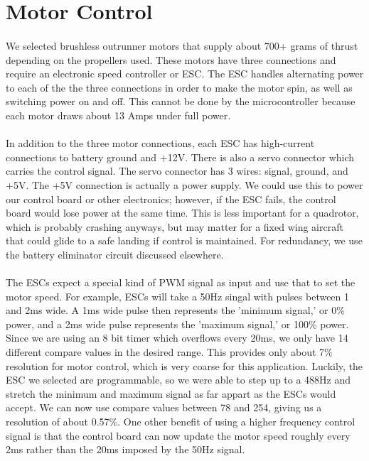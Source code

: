 \section{Motor Control}
\paragraph{}
We selected brushless outrunner motors that supply about 700+ grams of thrust depending on the propellers used.  These motors have three connections and require an electronic speed controller or ESC.  The ESC handles alternating power to each of the the three connections in order to make the motor spin, as well as switching power on and off.  This cannot be done by the microcontroller because each motor draws about 13 Amps under full power.
\paragraph{}
In addition to the three motor connections, each ESC has high-current connections to battery ground and +12V.  There is also a servo connector which carries the control signal.  The servo connector has 3 wires: signal, ground, and +5V.  The +5V connection is actually a power supply.  We could use this to power our control board or other electronics; however, if the ESC fails, the control board would lose power at the same time.  This is less important for a quadrotor, which is probably crashing anyways, but may matter for a fixed wing aircraft that could glide to a safe landing if control is maintained.  For redundancy, we use the battery eliminator circuit discussed elsewhere.
\paragraph{}
The ESCs expect a special kind of PWM signal as input and use that to set the motor speed.  For example, ESCs will take a 50Hz singal with pulses between 1 and 2ms wide.  A 1ms wide pulse then represents the 'minimum signal,' or 0\% power, and a 2ms wide pulse represents the 'maximum signal,' or 100\% power.  Since we are using an 8 bit timer which overflows every 20ms, we only have 14 different compare values in the desired range.  This provides only about 7\% resolution for motor control, which is very coarse for this application.  Luckily, the ESC we selected are programmable, so we were able to step up to a 488Hz and stretch the minimum and maximum signal as far appart as the ESCs would accept.  We can now use compare values between 78 and 254, giving us a resolution of about 0.57\%.  One other benefit of using a higher frequency control signal is that the control board can now update the motor speed roughly every 2ms rather than the 20ms imposed by the 50Hz signal.
